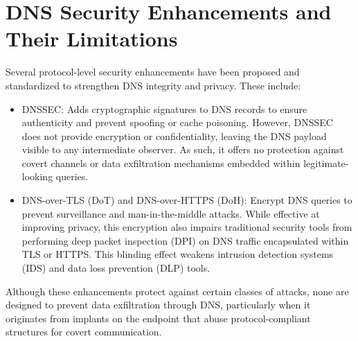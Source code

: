 \documentclass [11pt, proquest] {uwthesis}[2020/02/24]
\begin{document}
\section{DNS Security Enhancements and Their Limitations}
Several protocol-level security enhancements have been proposed and standardized to strengthen DNS integrity and privacy. These include:
\begin{itemize}
    \item DNSSEC: Adds cryptographic signatures to DNS records to ensure authenticity and prevent spoofing or cache poisoning. However, DNSSEC does not provide encryption or confidentiality, leaving the DNS payload visible to any intermediate observer. As such, it offers no protection against covert channels or data exfiltration mechanisms embedded within legitimate-looking queries.
    \item DNS-over-TLS (DoT) and DNS-over-HTTPS (DoH): Encrypt DNS queries to prevent surveillance and man-in-the-middle attacks. While effective at improving privacy, this encryption also impairs traditional security tools from performing deep packet inspection (DPI) on DNS traffic encapsulated within TLS or HTTPS. This blinding effect weakens intrusion detection systems (IDS) and data loss prevention (DLP) tools.
\end{itemize}
Although these enhancements protect against certain classes of attacks, none are designed to prevent data exfiltration through DNS, particularly when it originates from implants on the endpoint that abuse protocol-compliant structures for covert communication.
\end{document}
